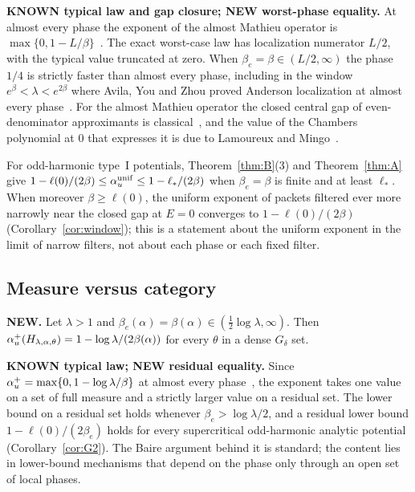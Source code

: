 \begin{remark}\label{rem:B}
\textbf{KNOWN typical law and gap closure; NEW worst-phase equality.} At almost every phase the exponent of the almost Mathieu operator is $\max\{0,1-L/\beta\}$~\cite[Theorem~A]{DMamo}. The exact worst-case law has localization numerator $L/2$, with the typical value truncated at zero. When $\beta_e=\beta\in(L/2,\infty)$ the phase $1/4$ is strictly faster than almost every phase, including in the window $e^{\beta}<\lambda<e^{2\beta}$ where Avila, You and Zhou proved Anderson localization at almost every phase~\cite{AYZ2017}. For the almost Mathieu operator the closed central gap of even-denominator approximants is classical~\cite{BellissardSimon1982}, and the value of the Chambers polynomial at $0$ that expresses it is due to Lamoureux and Mingo~\cite{LamoureuxMingo2007}.
\end{remark}

For odd-harmonic type~I potentials, Theorem~\ref{thm:B}(3) and Theorem~\ref{thm:A} give $1-\ell(0)/(2\beta)\le\alpha_u^{\mathrm{unif}}\le1-\ell_*/(2\beta)$ when $\beta_e=\beta$ is finite and at least $\ell_*$. When moreover $\beta\ge\ell(0)$, the uniform exponent of packets filtered ever more narrowly near the closed gap at $E=0$ converges to $1-\ell(0)/(2\beta)$ (Corollary~\ref{cor:window}); this is a statement about the uniform exponent in the limit of narrow filters, not about each phase or each fixed filter.

\subsection{Measure versus category}

\begin{maintheorem}[Category]\label{thm:C}
\textbf{NEW.} Let $\lambda>1$ and $\beta_e(\alpha)=\beta(\alpha)\in(\tfrac12\log\lambda,\infty)$. Then $\alpha_u^+(H_{\lambda,\alpha,\theta})=1-\log\lambda/(2\beta(\alpha))$ for every $\theta$ in a dense $G_\delta$ set.
\end{maintheorem}

\textbf{KNOWN typical law; NEW residual equality.} Since $\alpha_u^+=\max\{0,1-\log\lambda/\beta\}$ at almost every phase~\cite[Theorem~A]{DMamo}, the exponent takes one value on a set of full measure and a strictly larger value on a residual set. The lower bound on a residual set holds whenever $\beta_e>\log\lambda/2$, and a residual lower bound $1-\ell(0)/(2\beta_e)$ holds for every supercritical odd-harmonic analytic potential (Corollary~\ref{cor:G2}). The Baire argument behind it is standard; the content lies in lower-bound mechanisms that depend on the phase only through an open set of local phases.


